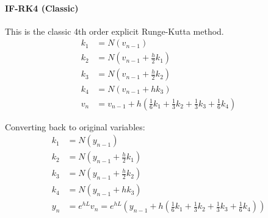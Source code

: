 \documentclass{article}
\theoremstyle{definition}
\begin{document}
\paragraph{IF-RK4 (Classic)} This is the classic 4th order explicit Runge-Kutta method.
\begin{align*}
k_1 &= N(v_{n-1})\\
k_2 &= N(v_{n-1}+\frac{h}{2}k_1)\\
k_3 &= N(v_{n-1} + \frac{h}{2}k_2)\\
k_4 &= N(v_{n-1}+hk_3)\\
v_n &= v_{n-1} + h(\frac{1}{6}k_1+\frac{1}{3}k_2+\frac{1}{3}k_3+\frac{1}{6}k_4)
\end{align*}

Converting back to original variables:
\begin{align*}
k_1 &= N(y_{n-1})\\
k_2 &= N(y_{n-1}+\frac{h}{2}k_1)\\
k_3 &= N(y_{n-1} + \frac{h}{2}k_2)\\
k_4 &= N(y_{n-1}+hk_3)\\
y_n &= e^{hL} v_n = e^{hL} \left(y_{n-1} + h(\frac{1}{6}k_1+\frac{1}{3}k_2+\frac{1}{3}k_3+\frac{1}{6}k_4)\right)
\end{align*}
\end{document}
